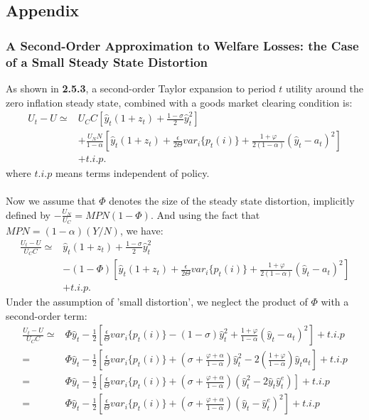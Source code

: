 \documentclass{article}
\numberwithin{equation}{section}
\begin{document}
	

\newpage
\subsection{Appendix}
\subsubsection{A Second-Order Approximation to Welfare Losses: the Case of a Small Steady State Distortion}
As shown in \textbf{2.5.3}, a second-order Taylor expansion to period $t$ utility around the zero inflation steady state, combined with a goods market clearing condition is:
	\begin{align*}
		U_t - U \simeq & U_C C \left[ \hat{y}_t (1 + z_t) + \frac{1 - \sigma}{2} \hat{y}^2_t \right]\\
		&+ \frac{U_N N}{1 - \alpha} \left[ \hat{y}_t (1 + z_t) + \frac{\epsilon}{2\Theta} var_i\{ p_t(i) \} + \frac{1 + \varphi}{2(1 - \alpha)} \left( \hat{y}_t - a_t \right)^2 \right]\\
		&+ t.i.p.
	\end{align*}	
where $t.i.p$ means terms independent of policy.\\\\
Now we assume that $\Phi$ denotes the size of the steady state distortion, implicitly defined by $-\frac{U_N}{U_C} = MPN(1 - \Phi)$. And using the fact that $MPN = (1 - \alpha)(Y/N)$, we have:
	\begin{align*}
		\frac{U_t - U}{U_C C} \simeq &\hat{y}_t (1 + z_t) + \frac{1 - \sigma}{2} \hat{y}^2_t\\
		&-(1 - \Phi) \left[ \hat{y}_t (1 + z_t) + \frac{\epsilon}{2\Theta} var_i\{ p_t(i) \} + \frac{1 + \varphi}{2(1 - \alpha)} \left( \hat{y}_t - a_t \right)^2 \right]\\
		&+ t.i.p.
	\end{align*}
Under the assumption of 'small distortion', we neglect the product of $\Phi$ with a second-order term:
	\begin{align*}
		\frac{U_t - U}{U_C C} \simeq &\Phi\hat{y}_t - \frac{1}{2} \left[ \frac{\epsilon}{\Theta}var_i\{ p_t(i) \} - (1 - \sigma)\hat{y}^2_t + \frac{1 + \varphi}{1 - \alpha}(\hat{y}_t - a_t)^2 \right] + t.i.p\\
		= &\Phi\hat{y}_t - \frac{1}{2} \left[ \frac{\epsilon}{\Theta}var_i\{ p_t(i) \} + (\sigma + \frac{\varphi + \alpha}{1 - \alpha})\hat{y}^2_t - 2\left( \frac{1 + \varphi}{1 - \alpha} \right) \hat{y}_ta_t \right] + t.i.p\\
		= &\Phi\hat{y}_t - \frac{1}{2} \left[ \frac{\epsilon}{\Theta}var_i\{ p_t(i) \} + (\sigma + \frac{\varphi + \alpha}{1 - \alpha}) (\hat{y}^2_t- 2\hat{y}_t\hat{y}^e_t) \right] + t.i.p\\
		= &\Phi\hat{y}_t - \frac{1}{2} \left[ \frac{\epsilon}{\Theta}var_i\{ p_t(i) \} + (\sigma + \frac{\varphi + \alpha}{1 - \alpha}) (\hat{y}_t- \hat{y}^e_t)^2 \right] + t.i.p
	\end{align*}
\end{document}
